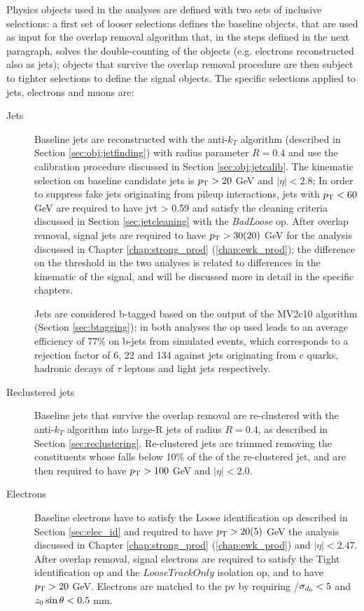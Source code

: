 Physics objects used in the analyses are defined with two sets of inclusive selections:
a first set of looser selections defines the baseline objects, that are used as input for the overlap removal algorithm that, in the steps defined in the next paragraph,
solves the double-counting of the objects (e.g. electrons reconstructed also as jets); objects that survive the overlap removal procedure are then subject to 
tighter selections to define the signal objects. The specific selections applied to jets, electrons and muons are:

\begin{description}

\item[Jets] Baseline jets are reconstructed with the anti-$k_T$ algorithm (described in Section \ref{sec:obj:jetfinding}) with radius parameter $R=0.4$ 
and use the calibration procedure discussed in Section \ref{sec:obj:jetcalib}. 
The kinematic selection on baseline candidate jets is  $p_{\rm T} > 20$ GeV and $|\eta|<2.8$; 
In order to suppress fake jets originating from pileup interactions, jets with $p_{\rm T}<60$ GeV are required to have \gls{jvt} > 0.59 and satisfy the cleaning criteria discussed in Section \ref{sec:jetcleaning} with the \textit{BadLoose} \gls{op}.
After overlap removal, signal jets are required to have $p_{\rm T}>30 (20)$ GeV for the analysis discussed in Chapter \ref{chap:strong_prod} (\ref{chap:ewk_prod}); the difference on the \pt threshold 
in the two analyses is related to differences in the kinematic of the signal, and will be discussed more in detail in the specific chapters.

Jets are considered b-tagged based on the output of the MV2c10 algorithm (Section \ref{sec:btagging}); in both analyses the \gls{op} used leads to an average efficiency of 77\% on b-jets from simulated  
\ttbar events, which corresponds to a rejection factor of 6, 22 and 134 against jets originating from c quarks, hadronic decays of $\tau$ leptons and light jets respectively. 


\item[Reclustered jets] Baseline jets that survive the overlap removal are re-clustered with the anti-$k_T$ algorithm into large-R jets of radius $R=0.4$, as described in Section \ref{sec:reclustering}. 
Re-clustered jets are trimmed removing the constituents whose \pt falls below 10\% of the \pt of the re-clustered jet, and are then required to have $p_{\rm T}>100$ GeV and $|\eta|<2.0$.

\item[Electrons] Baseline electrons have to satisfy the Loose identification \gls{op} described in Section \ref{sec:elec_id} and required to have $p_{\rm T} > 20 (5)$ GeV the analysis discussed in Chapter \ref{chap:strong_prod} (\ref{chap:ewk_prod}) and $|\eta|<2.47$. 
After overlap removal, signal electrons are required to satisfy the Tight identification \gls{op} and the $LooseTrackOnly$ isolation \gls{op}, and  to have $p_{\rm T} > 20$ GeV.
Electrons are matched to the \gls{pv} by requiring \dzero/$\sigma_{d_0} < 5$ and  ${z_0} \sin\theta < 0.5$ mm.



\end{description}
